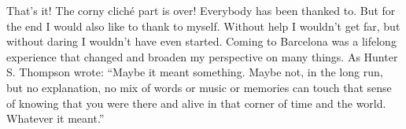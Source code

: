 \begin{acknowledgements}
That's it! The corny cliché part is over! Everybody has been thanked to. But for the end I would also like to thank to myself. Without help I wouldn't get far, but without daring I wouldn't have even started. Coming to Barcelona was a lifelong experience that changed and broaden my perspective on many things. As Hunter S. Thompson wrote: “Maybe it meant something. Maybe not, in the long run, but no explanation, no mix of words or music or memories can touch that sense of knowing that you were there and alive in that corner of time and the world. Whatever it meant.”

\end{acknowledgements}